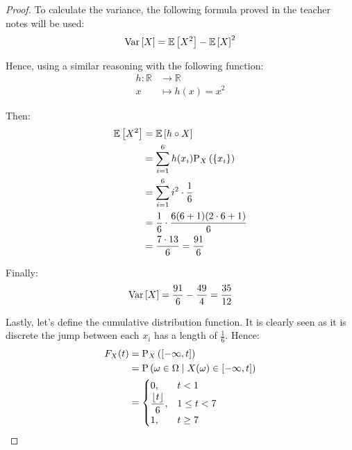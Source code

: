 \documentclass[11pt]{article}
\theoremstyle{definition}
\theoremstyle{remark}
\theoremstyle{remark}
\newcommand{\R}{{\mathbb{R}}}
\begin{document}
\begin{proof}
  To calculate the variance, the following formula proved in the
  teacher notes will be used:
  \begin{equation*}
    \V{X} = \E{X^2} - \E{X}^2
  \end{equation*}

  Hence, using a similar reasoning with the following function:
  \begin{align*}
    h : \R& \rightarrow \R \\
    x& \mapsto h(x) = x^2
  \end{align*}

  Then:
  \begin{align*}
    \E{X^2} &= \E{h \circ X} \\
            &= \sum_{i=1}^6 h(x_i) \P[X]{\{x_i\}} \\
            &= \sum_{i=1}^6 i^2 \cdot \frac{1}{6} \\
            &= \frac{1}{6} \cdot \frac{6 (6 + 1) (2\cdot 6 + 1)}{6} \\
            &= \frac{7 \cdot 13}{6} = \frac{91}{6}
  \end{align*}

  Finally:
  \begin{equation*}
    \V{X} = \frac{91}{6} - \frac{49}{4} = \frac{35}{12}
  \end{equation*}

  Lastly, let's define the cumulative distribution function. It is
  clearly seen as it is discrete the jump between each $x_i$ has a
  length of $\frac{1}{6}$. Hence:
  \begin{align*}
    F_X(t) &= \P[X]{[-\infty, t]} \\
           &= \P{\omega \in \Omega \mid X(\omega) \in [-\infty, t]} \\
    &=
      \begin{cases}
        0, &t < 1 \\
        \dfrac{\lfloor t \rfloor}{6}, &1 \le t < 7 \\
        1, &t \ge 7
      \end{cases}
  \end{align*}


\end{proof}
\end{document}
